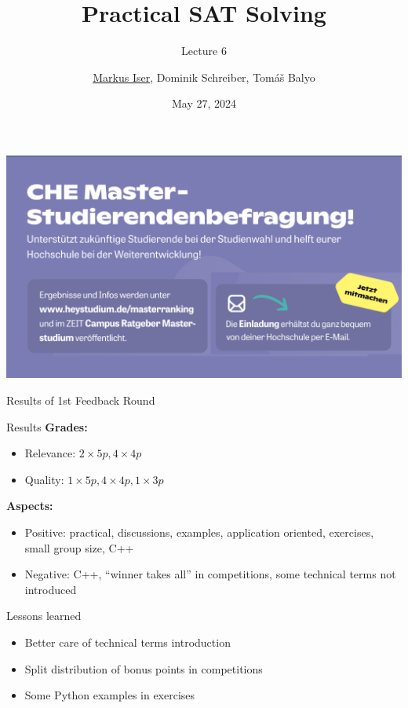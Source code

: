 \documentclass[t]{sdqbeamer}
\title[SAT Solving]{Practical SAT Solving}
\subtitle{Lecture 6}
\author{\underline{Markus Iser}, Dominik Schreiber, Tom\'a\v{s} Balyo}
\date{May 27, 2024}
\begin{document}
\begin{frame}
	\thispagestyle{empty}
	\titlepage
\end{frame}

\begin{frame}{}
    \vspace*{-1em}\hspace*{-3em}
    \includegraphics[width=1.11\linewidth]{chepresi.pdf}
\end{frame}

\begin{frame}{Results of 1st Feedback Round}
\begin{block}{Results}
\textbf{Grades:}
\begin{itemize}\setlength{\itemsep}{1ex}
    \item Relevance: $2 \times 5p, 4 \times 4p$
    \item Quality: $1 \times 5p, 4 \times 4p, 1 \times 3p$
\end{itemize}
\textbf{Aspects:}
\begin{itemize}\setlength{\itemsep}{1ex}
    \item Positive: practical, discussions, examples, application oriented, exercises, small group size, C++
    \item Negative: C++, ``winner takes all'' in competitions, some technical terms not introduced
\end{itemize}
\end{block}
\begin{block}{Lessons learned}
\begin{itemize}\setlength{\itemsep}{1ex}
    \item Better care of technical terms introduction
    \item Split distribution of bonus points in competitions
    \item Some Python examples in exercises
\end{itemize}
\end{block}
\end{frame}
\end{document}

